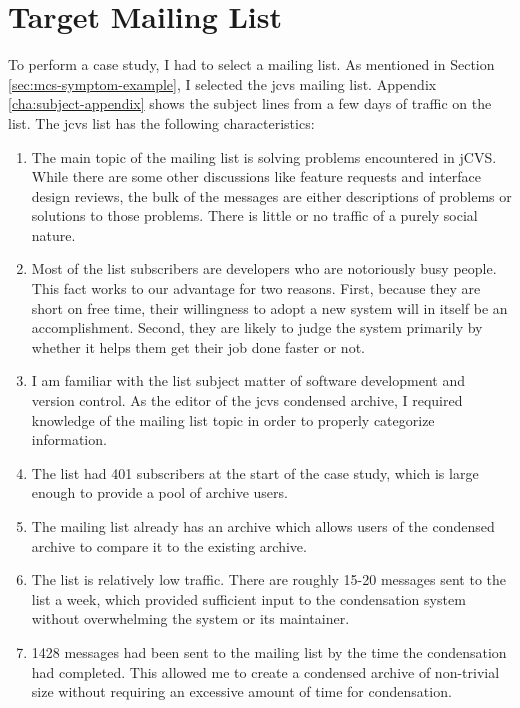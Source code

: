 \section{Target Mailing List}
\label{sec:target-list}
To perform a case study, I had to select a mailing list. As mentioned
in Section \ref{sec:mcs-symptom-example}, I selected the jcvs mailing list.
Appendix \ref{cha:subject-appendix} shows the subject lines from a few days of
traffic on the list. The jcvs list has the following characteristics:

\begin{enumerate}
\item The main topic of the mailing list is solving problems encountered in
  jCVS. While there are some other discussions like feature requests and
  interface design reviews, the bulk of the messages are either descriptions of
  problems or solutions to those problems. There is little or no traffic of a
  purely social nature.
  \label{enu:choice-topic}
  
\item Most of the list subscribers are developers who are notoriously busy
  people. This fact works to our advantage for two reasons.  First, because
  they are short on free time, their willingness to adopt a new system will in
  itself be an accomplishment. Second, they are likely to judge the system
  primarily by whether it helps them get their job done faster or not.
  
\item I am familiar with the list subject matter of software development and
  version control. As the editor of the jcvs condensed archive, I required
  knowledge of the mailing list topic in order to properly categorize
  information.
  \label{enu:choice-editor}
  
\item The list had 401 subscribers at the start of the case study, which is
  large enough to provide a pool of archive users.
  
\item The mailing list already has an archive which allows users of the
  condensed archive to compare it to the existing archive.
  
\item The list is relatively low traffic. There are roughly 15-20 messages sent
  to the list a week, which provided sufficient input to the condensation
  system without overwhelming the system or its maintainer.
  
\item 1428 messages had been sent to the mailing list by the time the
  condensation had completed. This allowed me to create a condensed archive of
  non-trivial size without requiring an excessive amount of time for
  condensation.
  

\end{enumerate}
